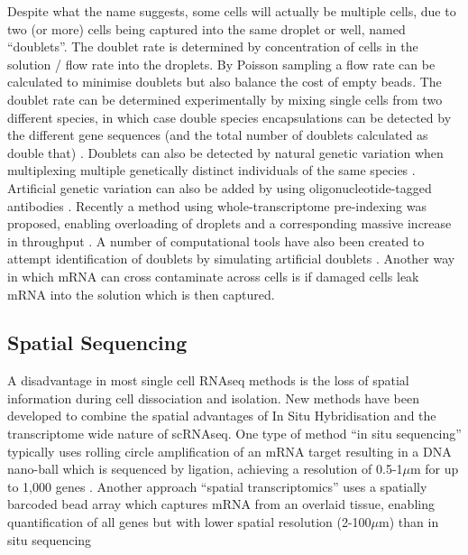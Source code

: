 Despite what the name suggests, some cells will actually be multiple cells, due to two (or more) cells being captured into the same droplet or well, named ``doublets''.
The doublet rate is determined by concentration of cells in the solution / flow rate into the droplets.
By Poisson sampling a flow rate can be calculated to minimise doublets but also balance the cost of empty beads.
The doublet rate can be determined experimentally by mixing single cells from two different species, in which case double species encapsulations can be detected by the different gene sequences (and the total number of doublets calculated as double that) \parencite{Macosko2015Highly}.
 Doublets can also be detected by natural genetic variation when multiplexing multiple genetically distinct individuals of the same species \parencite{Kang2018Multiplexed}.
Artificial genetic variation can also be added by using oligonucleotide-tagged antibodies \parencite{Stoeckius2018Cell}.
Recently a method using whole-transcriptome pre-indexing was proposed, enabling overloading of droplets and a corresponding massive increase in throughput \parencite{Datlinger2019Ultrahigh}.
A number of computational tools have also been created to attempt identification of doublets by simulating artificial doublets \parencite{Wolock2019Scrublet, McGinnis2019DoubletFinder}.
Another way in which mRNA can cross contaminate across cells is if damaged cells leak mRNA into the solution which is then captured.



\subsection{Spatial Sequencing}
A disadvantage in most single cell RNAseq methods is the loss of spatial information during cell dissociation and isolation.
New methods have been developed to combine the spatial advantages of In Situ Hybridisation and the transcriptome wide nature of scRNAseq.
One type of method ``in situ sequencing'' typically uses rolling circle amplification of an mRNA target resulting in a DNA nano-ball which is sequenced by ligation, achieving a resolution of 0.5-1$\mu$m for up to 1,000 genes \parencite{Lee2014Highly, Wang2018Threedimensional, Qian2018spatial}.
Another approach ``spatial transcriptomics'' uses a spatially barcoded bead array which captures mRNA from an overlaid tissue, enabling quantification of all genes but with lower spatial resolution (2-100$\mu$m) than in situ sequencing \parencite{Stahl2016Visualization, Rodriques2019Slideseq, Vickovic2019Highdefinition}


